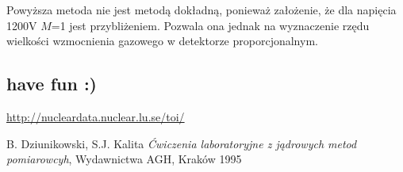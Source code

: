 \documentclass{article}
\begin{document}
Powyższa metoda nie jest metodą dokładną, ponieważ założenie, że dla napięcia 1200V $M$=1 jest przybliżeniem. Pozwala ona jednak na wyznaczenie rzędu wielkości wzmocnienia gazowego w detektorze proporcjonalnym.

\subsection{have fun :)}


\newpage
\begin{thebibliography}{9}
	
	
	\url{http://nucleardata.nuclear.lu.se/toi/}

	
	B. Dziunikowski, S.J. Kalita
	\emph{Ćwiczenia laboratoryjne z jądrowych metod pomiarowcyh}, Wydawnictwa AGH, Kraków 1995
	
\end{thebibliography}
\vspace{2cm}
\end{document}
